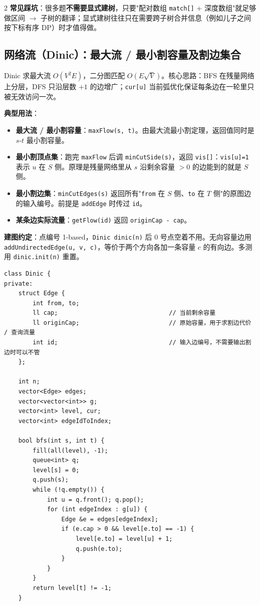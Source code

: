 \begin{multicols*}{2}
		\textbf{常见踩坑}：很多题\textbf{不需要显式建树}，只要"配对数组 \texttt{match[]} + 深度数组"就足够做区间 $\to$ 子树的翻译；显式建树往往只在需要跨子树合并信息（例如儿子之间按下标有序 DP）时才值得做。

		\subsection[\tochl{网络流（Dinic）：最大流 / 最小割容量及割边集合}]{网络流（Dinic）：最大流 / 最小割容量及割边集合}

		Dinic 求最大流 $O(V^2 E)$，二分图匹配 $O(E\sqrt{V})$。核心思路：BFS 在残量网络上分层，DFS 只沿层数 $+1$ 的边增广；\texttt{cur[u]} 当前弧优化保证每条边在一轮里只被无效访问一次。

		\textbf{典型用法}：

		\begin{itemize}
			\item \textbf{最大流 / 最小割容量}：\texttt{maxFlow(s, t)}。由最大流最小割定理，返回值同时是 $s\text{-}t$ 最小割容量。
			\item \textbf{最小割顶点集}：跑完 \texttt{maxFlow} 后调 \texttt{minCutSide(s)}，返回 \texttt{vis[]}：\texttt{vis[u]=1} 表示 $u$ 在 $S$ 侧。原理是残量网络里从 $s$ 沿剩余容量 $>0$ 的边能到的就是 $S$ 侧。
			\item \textbf{最小割边集}：\texttt{minCutEdges(s)} 返回所有"\texttt{from} 在 $S$ 侧、\texttt{to} 在 $T$ 侧"的原图边的输入编号。前提是 \texttt{addEdge} 时传过 \texttt{id}。
			\item \textbf{某条边实际流量}：\texttt{getFlow(id)} 返回 \texttt{originCap - cap}。
		\end{itemize}

		\textbf{建图约定}：点编号 1-based，\texttt{Dinic dinic(n)} 后 0 号点空着不用。无向容量边用 \texttt{addUndirectedEdge(u, v, c)}，等价于两个方向各加一条容量 $c$ 的有向边。多测用 \texttt{dinic.init(n)} 重置。

		\begin{verbatim}
class Dinic {
private:
    struct Edge {
        int from, to;
        ll cap;                               // 当前剩余容量
        ll originCap;                         // 原始容量，用于求割边代价 / 查询流量
        int id;                               // 输入边编号，不需要输出割边时可以不管
    };

    int n;
    vector<Edge> edges;
    vector<vector<int>> g;
    vector<int> level, cur;
    vector<int> edgeIdToIndex;

    bool bfs(int s, int t) {
        fill(all(level), -1);
        queue<int> q;
        level[s] = 0;
        q.push(s);
        while (!q.empty()) {
            int u = q.front(); q.pop();
            for (int edgeIndex : g[u]) {
                Edge &e = edges[edgeIndex];
                if (e.cap > 0 && level[e.to] == -1) {
                    level[e.to] = level[u] + 1;
                    q.push(e.to);
                }
            }
        }
        return level[t] != -1;
    }


\end{verbatim}
\end{multicols*}
